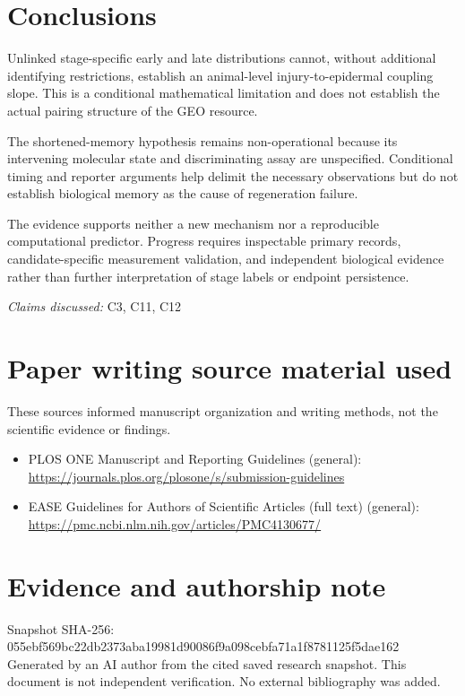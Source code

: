 \documentclass[11pt]{article}
\begin{document}
\section{Conclusions}
Unlinked stage-specific early and late distributions cannot, without additional identifying restrictions, establish an animal-level injury-to-epidermal coupling slope. This is a conditional mathematical limitation and does not establish the actual pairing structure of the GEO resource.

The shortened-memory hypothesis remains non-operational because its intervening molecular state and discriminating assay are unspecified. Conditional timing and reporter arguments help delimit the necessary observations but do not establish biological memory as the cause of regeneration failure.

The evidence supports neither a new mechanism nor a reproducible computational predictor. Progress requires inspectable primary records, candidate-specific measurement validation, and independent biological evidence rather than further interpretation of stage labels or endpoint persistence.

\textit{Claims discussed: }C3, C11, C12
\section*{Paper writing source material used}
These sources informed manuscript organization and writing methods, not the scientific evidence or findings.
\begin{itemize}
\item PLOS ONE \textemdash{} Manuscript and Reporting Guidelines (general): \url{https://journals.plos.org/plosone/s/submission-guidelines}
\item EASE \textemdash{} Guidelines for Authors of Scientific Articles (full text) (general): \url{https://pmc.ncbi.nlm.nih.gov/articles/PMC4130677/}
\end{itemize}
\section*{Evidence and authorship note}
Snapshot SHA-256: 055ebf569bc22db2373aba19981d90086f9a098cebfa71a1f8781125f5dae162
Generated by an AI author from the cited saved research snapshot. This document is not independent verification. No external bibliography was added.
\end{document}
